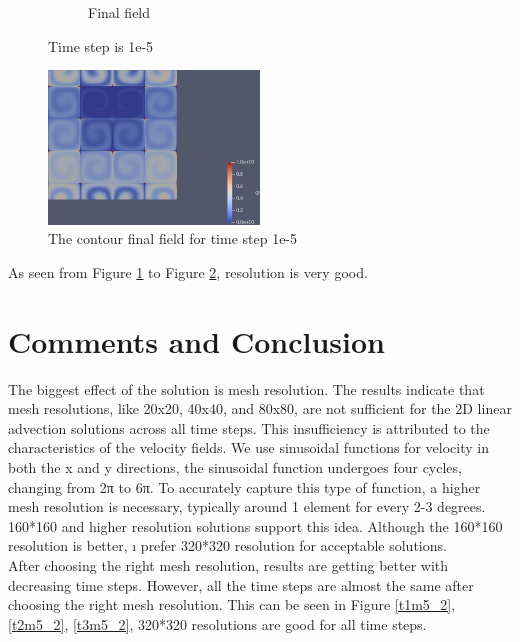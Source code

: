 \documentclass{article}
\begin{document}
\begin{figure}[hbt!]
\begin{subfigure}{0.4\textwidth}
        \caption{Final field}
  \end{subfigure}
  \caption{Time step is 1e-5}
  \label{t3m6_1} 
\end{figure}

\begin{figure}[hbt!]
    \centering
    \includegraphics[width=0.5\textwidth]{Figures/e-5 400x400/contour.png}
    \caption{The contour final field for time step 1e-5}
    \label{t3m6_2} 
\end{figure}

As seen from Figure \ref{t3m6_1} to Figure \ref{t3m6_2}, resolution is very good.


\clearpage
\section{Comments and Conclusion}

The biggest effect of the solution is mesh resolution. The results indicate that mesh resolutions, like 20x20, 40x40, and 80x80, are not sufficient for the 2D linear advection solutions across all time steps. This insufficiency is attributed to the characteristics of the velocity fields. We use sinusoidal functions for velocity in both the x and y directions, the sinusoidal function undergoes four cycles, changing from 2π to 6π. To accurately capture this type of function, a higher mesh resolution is necessary, typically around 1 element for every 2-3 degrees. 160*160 and higher resolution solutions support this idea. Although the 160*160 resolution is better, ı prefer 320*320 resolution for acceptable solutions. \\

After choosing the right mesh resolution, results are getting better with decreasing time steps. However, all the time steps are almost the same after choosing the right mesh resolution. This can be seen in Figure \ref{t1m5_2}, \ref{t2m5_2}, \ref{t3m5_2}, 320*320 resolutions are good for all time steps. 


\clearpagepage

\printbibliography
\end{document}
